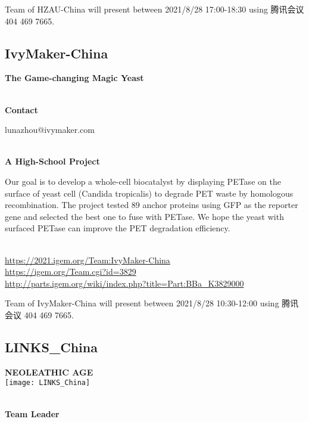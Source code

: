 Team of HZAU-China will present between        2021/8/28 17:00-18:30 using 腾讯会议 404 469 7665.
\newpage


\subsection{\textcolor{Blu}{ IvyMaker-China } }
\vspace{5mm}
\begin{center}
\large{
  \textbf{ The Game-changing Magic Yeast }\\

}
\end{center}
\textbf{\\Contact}

  lunazhou@ivymaker.com


\textbf{\\A High-School Project\\}\begin{spacing}{1.5}

Our goal is to develop a whole-cell biocatalyst by displaying PETase on the surface of yeast cell (Candida tropicalis) to degrade PET waste by homologous recombination. The project tested 89 anchor proteins using GFP as the reporter gene and selected the best one to fuse with PETase. We hope the yeast with surfaced PETase can improve the PET degradation efficiency.\end{spacing}
\\

\url{https://2021.igem.org/Team:IvyMaker-China }\\
\url{https://igem.org/Team.cgi?id=3829 }\\
\url{http://parts.igem.org/wiki/index.php?title=Part:BBa_K3829000 }\\


\vfill{}









Team of IvyMaker-China will present between     2021/8/28 10:30-12:00    using 腾讯会议 404 469 7665.
\newpage


\subsection{\textcolor{Blu}{ LINKS\_China } }
\vspace{5mm}
\begin{center}
\large{
  \textbf{ NEOLEATHIC AGE }\\
  \texttt{[image: LINKS\_China]}
}
\end{center}
\textbf{\\Team Leader}

